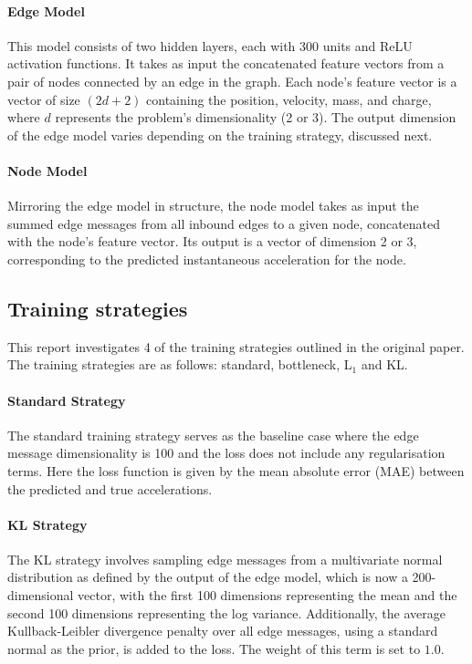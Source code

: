 \documentclass[11pt]{article}
\begin{document}
\paragraph*{Edge Model} This model consists of two hidden layers, each with 300 units and ReLU activation functions. It takes as input the concatenated feature vectors from a pair of nodes connected by an edge in the graph. Each node's feature vector is a vector of size $(2d+2)$ containing the position, velocity, mass, and charge, where $d$ represents the problem's dimensionality (2 or 3). The output dimension of the edge model varies depending on the training strategy, discussed next.

\paragraph*{Node Model} Mirroring the edge model in structure, the node model takes as input the summed edge messages from all inbound edges to a given node, concatenated with the node's feature vector. Its output is a vector of dimension 2 or 3, corresponding to the predicted instantaneous acceleration for the node.
\subsection{Training strategies}
This report investigates 4 of the training strategies outlined in the original paper. The training strategies are as follows: standard, bottleneck, L$_1$ and KL.

\paragraph*{Standard Strategy}
The standard training strategy serves as the baseline case where the edge message dimensionality is 100 and the loss does not include any regularisation terms. Here the loss function is given by the mean absolute error (MAE) between the predicted and true accelerations.

\paragraph*{KL Strategy}
The KL strategy involves sampling edge messages from a multivariate normal distribution as defined by the output of the edge model, which is now a 200-dimensional vector, with the first 100 dimensions representing the mean and the second 100 dimensions representing the log variance. Additionally, the average Kullback-Leibler divergence penalty over all edge messages, using a standard normal as the prior, is added to the loss. The weight of this term is set to \(1.0 \).
\end{document}
